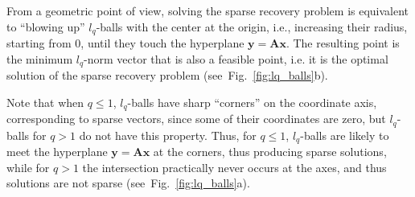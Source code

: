\documentclass[journal]{IEEEtran}
\begin{document}
From a geometric point of view, solving the sparse recovery problem is equivalent to “blowing up” $l_q$-balls with the center at the origin, i.e., increasing their radius, starting from 0, until they touch the hyperplane $\boldsymbol{y}=\boldsymbol{A} \boldsymbol{x}$. The resulting point is the minimum $l_q$-norm vector that is also a feasible point, i.e. it is the optimal solution of the sparse recovery problem (see~Fig.~\ref{fig:lq_balls}b).

Note that when $q\leq 1$, $l_q$-balls have sharp “corners” on the coordinate axis, corresponding to sparse vectors, since some of their coordinates are zero, but $l_q$-balls for $q>1$ do not have this property. Thus, for $q \leq 1$, $l_q$-balls are likely to meet the hyperplane $\boldsymbol{y}=\boldsymbol{A} \boldsymbol{x}$ at the corners, thus producing sparse solutions, while for $q>1$ the intersection practically never occurs at the axes, and thus solutions are not sparse (see~Fig.~\ref{fig:lq_balls}a).
\end{document}
